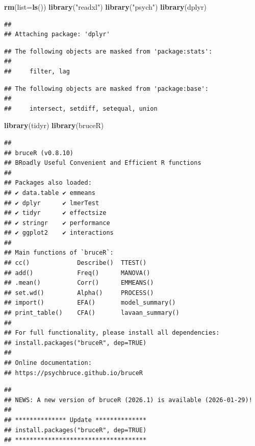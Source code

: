 \documentclass[
]{ctexart}
\newenvironment{Shaded}{\begin{snugshade}}{\end{snugshade}}
\newcommand{\AttributeTok}[1]{\textcolor[rgb]{0.13,0.29,0.53}{#1}}
\newcommand{\FunctionTok}[1]{\textcolor[rgb]{0.13,0.29,0.53}{\textbf{#1}}}
\newcommand{\NormalTok}[1]{#1}
\newcommand{\StringTok}[1]{\textcolor[rgb]{0.31,0.60,0.02}{#1}}
\begin{document}
\begin{Shaded}
\begin{Highlighting}[]
\FunctionTok{rm}\NormalTok{(}\AttributeTok{list=}\FunctionTok{ls}\NormalTok{())}
\FunctionTok{library}\NormalTok{(}\StringTok{"readxl"}\NormalTok{)}
\FunctionTok{library}\NormalTok{(}\StringTok{"psych"}\NormalTok{)}
\FunctionTok{library}\NormalTok{(dplyr)}
\end{Highlighting}
\end{Shaded}

\begin{verbatim}
## 
## Attaching package: 'dplyr'
\end{verbatim}

\begin{verbatim}
## The following objects are masked from 'package:stats':
## 
##     filter, lag
\end{verbatim}

\begin{verbatim}
## The following objects are masked from 'package:base':
## 
##     intersect, setdiff, setequal, union
\end{verbatim}

\begin{Shaded}
\begin{Highlighting}[]
\FunctionTok{library}\NormalTok{(tidyr)}
\FunctionTok{library}\NormalTok{(bruceR)}
\end{Highlighting}
\end{Shaded}

\begin{verbatim}
## 
## bruceR (v0.8.10)
## BRoadly Useful Convenient and Efficient R functions
## 
## Packages also loaded:
## ✔ data.table ✔ emmeans
## ✔ dplyr      ✔ lmerTest
## ✔ tidyr      ✔ effectsize
## ✔ stringr    ✔ performance
## ✔ ggplot2    ✔ interactions
## 
## Main functions of `bruceR`:
## cc()             Describe()  TTEST()
## add()            Freq()      MANOVA()
## .mean()          Corr()      EMMEANS()
## set.wd()         Alpha()     PROCESS()
## import()         EFA()       model_summary()
## print_table()    CFA()       lavaan_summary()
## 
## For full functionality, please install all dependencies:
## install.packages("bruceR", dep=TRUE)
## 
## Online documentation:
## https://psychbruce.github.io/bruceR
\end{verbatim}

\begin{verbatim}
## 
## NEWS: A new version of bruceR (2026.1) is available (2026-01-29)!
## 
## ************** Update **************
## install.packages("bruceR", dep=TRUE)
## ************************************
\end{verbatim}
\end{document}

